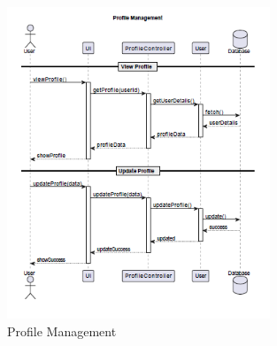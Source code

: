 \documentclass[12pt,a4paper]{report}
\begin{document}
\begin{figure}[htbp]
    \centering
    \includegraphics[width=0.7\textwidth]{profile-management.png}
    \caption{Profile Management}
    \label{fig:profile-management}
\end{figure}
\end{document}
